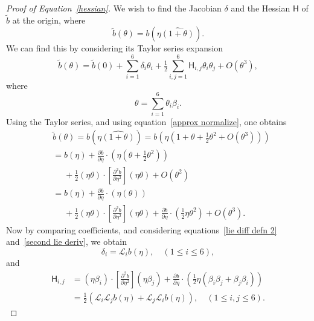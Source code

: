 \documentclass[reqno,12pt]{amsart}
\newcommand{\liederiv}{\mathcal L}
\begin{document}
\begin{proof}[Proof of Equation~\eqref{hessian}]
We wish to find the Jacobian $\delta$ and the Hessian $\mathsf H$ of $\tilde b$ at the origin, where
\begin{equation}
\tilde b(\theta) = b(\eta  \widehat{(1 + \theta)}).
\end{equation}
We can find this by considering its Taylor series expansion
\begin{equation}
\tilde b(\theta) = \tilde b(0) + \sum_{i=1}^6 \delta_{i} \theta_i + \tfrac12 \sum_{i,j=1}^6 \mathsf H_{i,j} \theta_i \theta_j + O(\theta^3),
\end{equation}
where
\begin{equation}
\theta = \sum_{i=1}^6 \theta_i \beta_i.
\end{equation}
Using the Taylor series, and using equation~\eqref{approx normalize}, one obtains
\begin{equation}
\begin{aligned}
&\tilde b(\theta) = b(\eta  \widehat{(1 + \theta)})
= b(\eta(1 + \theta + \tfrac12 \theta^2 + O(\theta^3))) \\
&= b(\eta) + \frac{\partial b}{\partial \eta} \cdot(\eta(\theta + \tfrac12 \theta^2)) \\
&\phantom{{}={}} + \tfrac12 (\eta \theta) \cdot \left[\frac{\partial^2 b}{\partial \eta^2}\right] (\eta\theta)
+ O(\theta^2) \\
&= b(\eta) + \frac{\partial b}{\partial \eta} \cdot(\eta(\theta)) \\
&\phantom{{}={}} + \tfrac12 (\eta \theta) \cdot \left[\frac{\partial^2 b}{\partial \eta^2}\right] (\eta\theta) + \frac{\partial b}{\partial \eta} \cdot(\tfrac12 \eta \theta^2) + O(\theta^3) .
\end{aligned}
\end{equation}
Now by comparing coefficients, and considering equations~\eqref{lie diff defn 2} and~\eqref{second lie deriv}, we obtain
\begin{equation}
\delta_i = \liederiv_i b(\eta), \quad (1 \le i \le 6),
\end{equation}
and
\begin{equation}
\begin{aligned}
\mathsf H_{i,j} &=
(\eta \beta_i) \cdot \left[\frac{\partial^2 b}{\partial \eta^2}\right] (\eta\beta_j) + \frac{\partial b}{\partial \eta} \cdot(\tfrac12 \eta(\beta_i\beta_j+\beta_j\beta_i)) \\
&= \tfrac12 (\liederiv_i \liederiv_j b(\eta) + \liederiv_j \liederiv_i b(\eta)),
\quad (1\le i,j\le 6).
\end{aligned}
\end{equation}
\end{proof}
\end{document}
